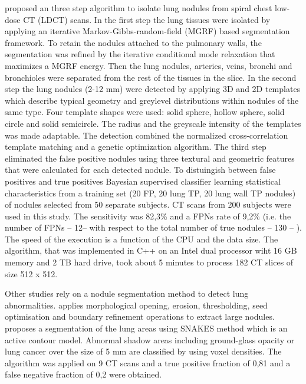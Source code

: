 \cite{elbaz} proposed an three step algorithm to isolate lung nodules from
spiral chest low-dose CT (LDCT) scans. In the first step the lung tissues were
isolated by applying an iterative Markov-Gibbs-random-field (MGRF) based
segmentation framework. To retain the nodules attached to the pulmonary walls, the
segmentation was refined by the iterative conditional mode relaxation that
maximizes a MGRF energy. Then the lung nodules, arteries, veins, bronchi and
bronchioles were separated from the rest of the tissues in the slice. In the
second step the lung nodules (2-12 mm) were detected by applying 3D and 2D
templates which describe typical geometry and greylevel distributions within
nodules of the same type. Four template shapes were used: solid sphere, hollow
sphere, solid circle and solid semicircle. The radius and the greyscale
intensity of the templates was made adaptable. The detection combined the
normalized cross-correlation template matching and a genetic optimization
algorithm. The third step eliminated the false positive nodules using three
textural and geometric features that were calculated for each detected nodule.
To distuingish between false positives and true positives Bayesian supervised
classifier learning statistical characteristics from a training set (20 FP, 20
lung TP, 20 lung wall TP nodules) of nodules selected from 50 separate subjects.
CT scans from 200 subjects were used in this study. The sensitivity was 82,3\%
and a FPNs rate of 9,2\% (i.e. the number of FPNs -- 12-- with respect to the
total number of true nodules -- 130 -- ). The speed of the execution is a
function of the CPU and the data size. The algorithm, that was implemented in
C++ on an Intel dual processor wiht 16 GB memory and 2 TB hard drive, took about
5 minutes to process 182 CT slices of size 512 x 512.

Other studies rely on a nodule segmentation method to detect lung abnormalities.
\cite{kuh} applies morphological opening, erosion, thresholding, seed
optimisation and boundary refinement operations to extract large nodules.
\cite{itai} proposes a segmentation of the lung areas using SNAKES method which
is an active contour model. Abnormal shadow areas including ground-glass opacity
or lung cancer over the size of 5 mm are classified by using voxel densities.
The algorithm was applied on 9 CT scans and a true positive fraction of 0,81 and
a false negative fraction of 0,2 were obtained.

